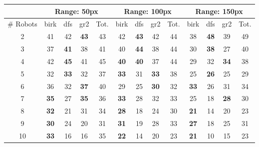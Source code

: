 \documentclass[letterpaper]{article}
\begin{document}
\begin{tabular}{|c|c|c|c|c|c|c|c|c|c|c|c|c|}
\hline
& \multicolumn{4}{|c|}{Range: 50px} & \multicolumn{4}{|c|}{Range: 100px} & \multicolumn{4}{|c|}{Range: 150px} \\ \hline
\# Robots & birk & dfs & gr2 & Tot. & birk & dfs & gr2 & Tot. & birk & dfs & gr2 & Tot. \\ \hline
2 & 41 & 42 & \textbf{43} & 43 & 42 & \textbf{43} & 42 & 44 & 38 & \textbf{48} & 39 & 49 \\ \hline
3 & 37 & \textbf{41} & 38 & 41 & 40 & \textbf{44} & 38 & 44 & 30 & \textbf{38} & 27 & 40 \\ \hline
4 & 42 & \textbf{45} & 41 & 45 & \textbf{40} & \textbf{40} & 37 & 44 & 29 & 32 & \textbf{34} & 38 \\ \hline
5 & 32 & \textbf{33} & 32 & 37 & \textbf{33} & 31 & \textbf{33} & 38 & 25 & \textbf{26} & 25 & 29 \\ \hline
6 & 36 & 32 & \textbf{37} & 40 & 29 & 25 & \textbf{30} & 32 & \textbf{33} & 26 & 31 & 34 \\ \hline
7 & \textbf{35} & 27 & \textbf{35} & 36 & \textbf{33} & 28 & 32 & 33 & 25 & 18 & \textbf{28} & 30 \\ \hline
8 & \textbf{32} & 21 & 31 & 34 & \textbf{28} & 18 & 24 & 30 & \textbf{21} & 14 & 20 & 23 \\ \hline
9 & \textbf{30} & 24 & 20 & 31 & \textbf{31} & 19 & 28 & 33 & \textbf{27} & 18 & 25 & 31 \\ \hline
10 & \textbf{33} & 16 & 16 & 35 & \textbf{22} & 14 & 20 & 23 & \textbf{21} & 10 & 15 & 23 \\ \hline
\end{tabular}
\end{document}
